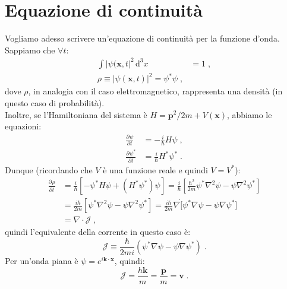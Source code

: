 \documentclass[10pt,a4paper]{report}
\theoremstyle{definition}
\newcommand{\pdev}[3][]{\frac{\partial^{#1} #2}{\partial #3^{#1}}}
\numberwithin{equation}{section}
\newcommand{\diff}[1][]{\mathrm{d}#1}
\begin{document}
\section{Equazione di continuità}
Vogliamo adesso scrivere un'equazione di continuità per la funzione d'onda. Sappiamo che $\forall t$:
\begin{align*}
\int |\psi(\mathbf{x},t|^2\,\diff^3{x} &= 1\;, \\
\rho\equiv |\psi(\mathbf{x},t)|^2=\psi^*\psi\;,
\end{align*}
dove $\rho$, in analogia con il caso elettromagnetico, rappresenta una densità (in questo caso di probabilità). \\
Inoltre, se l'Hamiltoniana del sistema è $H=\mathbf{p}^2/2m+V(\mathbf{x})$, abbiamo le equazioni:
\begin{align}
\pdev{\psi}{t}&=-\frac{i}{\hbar}H\psi\;, \\
\pdev{\psi^*}{t}&= \frac{i}{\hbar}H^*\psi^*\;.
\end{align}
Dunque (ricordando che $V$ è una funzione reale e quindi $V=V^*$):
\begin{align*}
\pdev{\rho}{t}&=\frac{i}{\hbar}[-\psi^*H\psi+(H^*\psi^*)\psi]=\frac{i}{\hbar}\left[\frac{\hbar^2}{2m} \psi^*
\nabla^2\psi-\psi\nabla^2 \psi^*\right] \\
&= \frac{i\hbar}{2m}[\psi^*\nabla^2\psi-\psi\nabla^2\psi^*]=\frac{i\hbar}{2m}\nabla\dot[\psi^*\nabla\psi-\psi\nabla\psi^*] \\
&=\nabla\cdot \boldsymbol{\mathcal{J}}\;,
\end{align*}
quindi l'equivalente della corrente in questo caso è:
\begin{equation}
\boldsymbol{\mathcal{J}}\equiv \frac{\hbar}{2mi}(\psi^*\nabla\psi-\psi\nabla\psi^*)\;.
\end{equation}
Per un'onda piana è $\psi=e^{i\mathbf{k}\cdot\mathbf{x}}$, quindi:
$$
\boldsymbol{\mathcal{J}}=\frac{h\mathbf{k}}{m}=\frac{\mathbf{p}}{m}=\mathbf{v}\;.
$$
\end{document}

